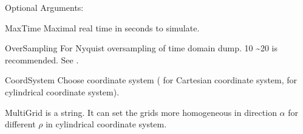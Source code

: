 \begin{FontDescr}{Optional Arguments:}
    \begin{FontPara}{MaxTime}  \label{para:MaxTime}
    Maximal real time in seconds to simulate.
    \end{FontPara}
    \begin{FontPara}{OverSampling}  \label{para:OverSampling}
    For Nyquist oversampling of time domain dump. 10 \textasciitilde 20 is recommended. See \cite{Nyquist-Shannon_sampling}. 
    \end{FontPara}
    \begin{FontPara}{CoordSystem}  \label{para:CoordSystem}
    Choose coordinate system ( for Cartesian coordinate system,  for cylindrical coordinate system).
    \end{FontPara}
    \begin{FontPara}{MultiGrid}  \label{para:MultiGrid}
     is a string. It can set   the grids  more homogeneous in direction $\alpha$ for different $\rho$ in cylindrical coordinate system. 
    \end{FontPara}
\end{FontDescr}

